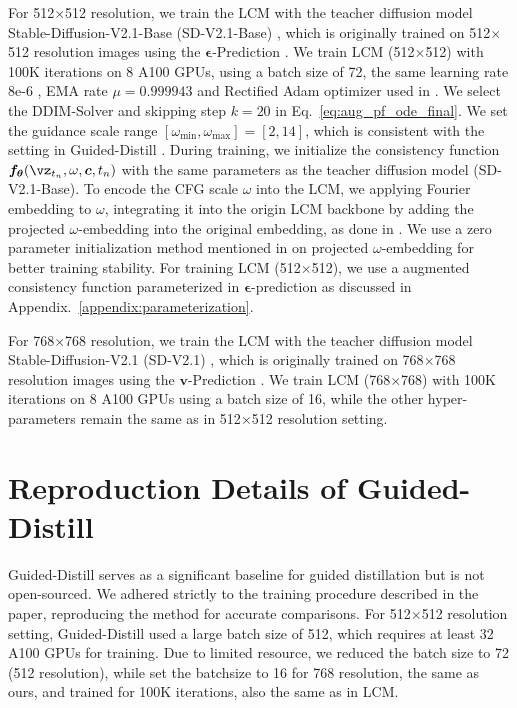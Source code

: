 \documentclass{article} %
\begin{document}
For 512$\times$512 resolution, we train the LCM with the teacher diffusion model Stable-Diffusion-V2.1-Base (SD-V2.1-Base) \citep{rombach2022high}, which is originally trained on 512$\times$512 resolution images using the $\boldsymbol{\epsilon}$-Prediction \citep{ho2020denoising}. We train LCM (512$\times$512) with 100K iterations on 8 A100 GPUs, using a batch size of 72, the same learning rate 8e-6 , EMA rate $\mu=0.999943$ and Rectified Adam optimizer \citep{liu2019variance} used in \citep{song2023consistency}. We select the DDIM-Solver \citep{song2020denoising} and skipping step $k=20$ in Eq.~\ref{eq:aug_pf_ode_final}. We set the guidance scale range $[\omega_{\text{min}}, \omega_{\text{max}}] = [2, 14]$, which is consistent with the setting in Guided-Distill \citep{meng2023distillation}. During training, we initialize the consistency function $\boldsymbol{f_\theta}(\boldsymbol{\vz}_{t_{n}}, \omega, \boldsymbol{c}, t_{n})$ with the same parameters as the teacher diffusion model (SD-V2.1-Base). To encode the CFG scale $\omega$ into the LCM, we applying Fourier embedding to $\omega$, integrating it into the origin LCM backbone by adding the projected $\omega$-embedding into the original embedding, as done in \citep{meng2023distillation}.  We use a zero parameter initialization method mentioned in \citep{zhang2023adding} on projected $\omega$-embedding for better training stability. For training LCM (512$\times$512), we use a augmented consistency function parameterized in $\boldsymbol{\epsilon}$-prediction as discussed in Appendix.~\ref{appendix:parameterization}.

For 768$\times$768 resolution, we train the LCM with the teacher diffusion model Stable-Diffusion-V2.1 (SD-V2.1) \citep{rombach2022high}, which is originally trained on 768$\times$768 resolution images using the $\boldsymbol{v}$-Prediction \citep{salimans2022progressive}. We train LCM (768$\times$768) with 100K iterations on 8 A100 GPUs using a batch size of 16, while the other hyper-parameters remain the same as in 512$\times$512 resolution setting. 



\section{Reproduction Details of Guided-Distill \label{appendix:reproduction}}

Guided-Distill \citep{meng2023distillation} serves as a significant baseline for guided distillation but is not open-sourced. We adhered strictly to the training procedure described in the paper, reproducing the method for accurate comparisons. For 512$\times$512 resolution setting, Guided-Distill \citep{meng2023distillation} used a large batch size of 512, which requires at least 32 A100 GPUs for training. Due to limited resource, we reduced the batch size to 72 (512 resolution), while set the batchsize to 16 for 768 resolution, the same as ours, and trained for 100K iterations, also the same as in LCM. 
\end{document}
